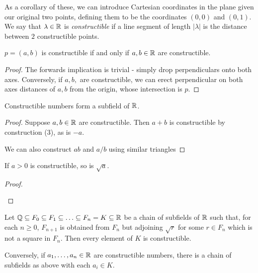 \documentclass[a4paper, 10pt, twocolumn]{amsart}
\begin{document}
\newpage
As a corollary of these, we can introduce Cartesian coordinates in the plane given our original two points, defining them to be the coordinates $(0,0)$ and $(0,1)$. We say that $\lambda\in\mathbb{R}$ is \emph{constructible} if a line segment of length $|\lambda|$ is the distance between $2$ constructible points.
\begin{lemma}
$p=(a,b)$ is constructible if and only if $a,b \in \mathbb{R}$ are constructible.
\end{lemma}
\begin{proof}
The forwards implication is trivial - simply drop perpendiculars onto both axes. Conversely, if $a,b,$ are constructible, we can erect perpendicular on both axes distances of $a, b$ from the origin, whose intersection is $p$.
\end{proof}
\begin{proposition}
Constructible numbers form a subfield of $\mathbb{R}$.
\end{proposition}
\begin{proof}
Suppose $a,b \in \mathbb{R}$ are constructible. Then $a+b$ is constructible by construction (3), as is $-a$.

We can also construct $ab$ and $a/b$ using similar triangles %
\end{proof}

\begin{proposition}
If $a>0$ is constructible, so is $\sqrt{a}$.
\end{proposition}
\begin{proof}
\item
\begin{center}
\end{center}
\end{proof}

\begin{corollary}
Let $\mathbb{Q} \subseteq F_0 \subseteq F_1 \subseteq \ldots \subseteq F_n = K \subseteq \mathbb{R}$ be a chain of subfields of $\mathbb{R}$ such that, for each $n\geq 0$, $F_{n+1}$ is obtained from $F_n$ but adjoining $\sqrt{r}$ for some $r \in F_n$ which is not a square in $F_n$. Then every element of $K$ is constructible.

Conversely, if $a_1, \ldots, a_n \in \mathbb{R}$ are constructible numbers, there is a chain of subfields as above with each $a_i \in K$.
\end{corollary}
\end{document}
